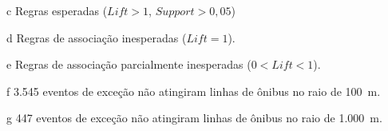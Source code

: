 \documentclass{beamer}
\begin{document}
\begin{frame}
\begin{table}[!htb]
\begin{adjustbox}{max height=10mm, width=3in}
\begin{threeparttable}
\begin{tablenotes}
            \item[c] Regras esperadas ($Lift > 1$, $Support > 0,05$)
            \item[d] Regras de associação inesperadas ($Lift = 1$).
            \item[e] Regras de associação parcialmente inesperadas ($0 < Lift < 1$).
            \item[f] 3.545 eventos de exceção não atingiram linhas de ônibus no raio de 100~m.
            \item[g] 447 eventos de exceção não atingiram linhas de ônibus no raio de 1.000~m.
        \end{tablenotes}
\end{threeparttable}
\end{adjustbox}
\end{table}
\end{frame}
\end{document}
